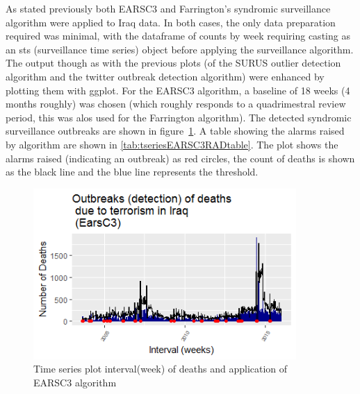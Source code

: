 As stated previously both EARSC3 and Farrington's syndromic surveillance algorithm were applied to Iraq data. In both cases, the only data preparation required was minimal, with the dataframe of counts by week requiring casting as an sts (surveillance time series) object before applying the surveillance algorithm. The output though as with the previous plots (of the SURUS outlier detection algorithm and the twitter outbreak detection algorithm) were enhanced by plotting them with ggplot. For the EARSC3 algorithm, a baseline of 18 weeks (4 months roughly) was chosen (which roughly responds to a  quadrimestral review period, this was alos used for the Farrington algorithm). The detected syndromic surveillance outbreaks are shown in figure~\ref{fig:tseriesEARSC3RAD}. A table showing the alarms raised by algorithm are shown in \ref{tab:tseriesEARSC3RADtable}. The plot shows the alarms raised (indicating an outbreak) as red circles, the count of deaths is shown as the black line and the blue line represents the threshold. 


\begin{figure}[t]
\includegraphics[width=10cm]{Peters_experiment_markdown_files/figure-latex/Rplot02_EarsC3.png}
\caption{Time series plot interval(week) of deaths and application of EARSC3 algorithm}
\label{fig:tseriesEARSC3RAD}
\centering
\end{figure}

